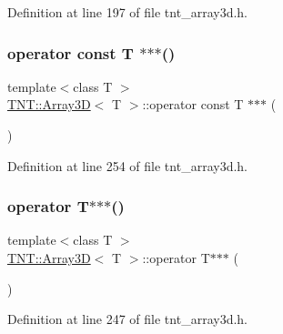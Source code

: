 Definition at line 197 of file tnt\+\_\+array3d.\+h.

\mbox{\label{classTNT_1_1Array3D_a420ffed5ca81952d989afe406450a9b0}} 
\subsubsection{\texorpdfstring{operator const T $\ast$$\ast$$\ast$()}{operator const T ***()}}
{\footnotesize\ttfamily template$<$class T $>$ \\
\hyperlink{classTNT_1_1Array3D}{T\+N\+T\+::\+Array3D}$<$ T $>$\+::operator const T $\ast$$\ast$$\ast$ (\begin{DoxyParamCaption}{ }\end{DoxyParamCaption})\hspace{0.3cm}{\ttfamily [inline]}}



Definition at line 254 of file tnt\+\_\+array3d.\+h.

\mbox{\label{classTNT_1_1Array3D_ab759135a50b2705bfc1ca7455c426b0a}} 
\subsubsection{\texorpdfstring{operator T$\ast$$\ast$$\ast$()}{operator T***()}}
{\footnotesize\ttfamily template$<$class T $>$ \\
\hyperlink{classTNT_1_1Array3D}{T\+N\+T\+::\+Array3D}$<$ T $>$\+::operator T$\ast$$\ast$$\ast$ (\begin{DoxyParamCaption}{ }\end{DoxyParamCaption})\hspace{0.3cm}{\ttfamily [inline]}}



Definition at line 247 of file tnt\+\_\+array3d.\+h.

\mbox{\label{classTNT_1_1Array3D_a405e5c9c24c7b3895533fa8f870f9bfd}} 
